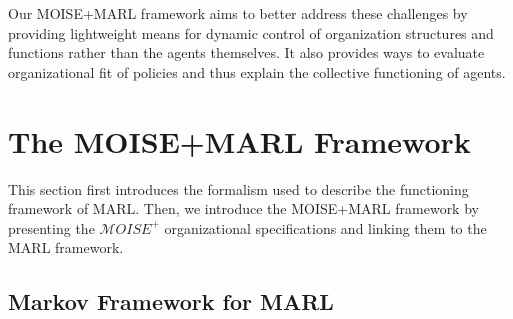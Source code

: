 \documentclass[sigconf,anonymous]{aamas}
\begin{document}
Our MOISE+MARL framework aims to better address these challenges by providing lightweight means for dynamic control of organization structures and functions rather than the agents themselves. It also provides ways to evaluate organizational fit of policies and thus explain the collective functioning of agents.

%

\section{The MOISE+MARL Framework}
\label{sec:moise_marl_framework}

This section first introduces the formalism used to describe the functioning framework of MARL. Then, we introduce the MOISE+MARL framework by presenting the $\mathcal{M}OISE^+$ organizational specifications and linking them to the MARL framework.

\subsection{Markov Framework for MARL}
\end{document}
